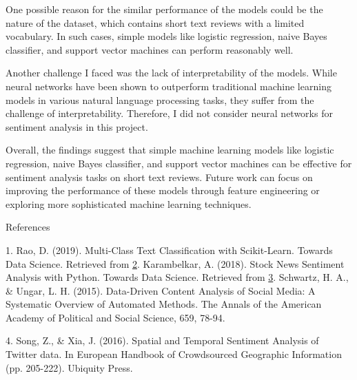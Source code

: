 \documentclass{article}
\begin{document}
One possible reason for the similar performance of the models could be the nature of the dataset, which contains short text reviews with a limited vocabulary. In such cases, simple models like logistic regression, naive Bayes classifier, and support vector machines can perform reasonably well.

Another challenge I faced was the lack of interpretability of the models. While neural networks have been shown to outperform traditional machine learning models in various natural language processing tasks, they suffer from the challenge of interpretability. Therefore, I did not consider neural networks for sentiment analysis in this project.

Overall, the findings suggest that simple machine learning models like logistic regression, naive Bayes classifier, and support vector machines can be effective for sentiment analysis tasks on short text reviews. Future work can focus on improving the performance of these models through feature engineering or exploring more sophisticated machine learning techniques.

\newpage
\pagebreak[]

References

1. Rao, D. (2019). Multi-Class Text Classification with Scikit-Learn. Towards Data Science. Retrieved from \href{https://towardsdatascience.com/multi-class-text-classification-with-scikit-learn-12f1e60e0a9f.}

2. Karambelkar, A. (2018). Stock News Sentiment Analysis with Python. Towards Data Science. Retrieved from \href{https://towardsdatascience.com/stock-news-sentiment-analysis-with-python-193d4b4378d4 }

3. Schwartz, H. A., & Ungar, L. H. (2015). Data-Driven Content Analysis of Social Media: A Systematic Overview of Automated Methods. The Annals of the American Academy of Political and Social Science, 659, 78-94. 

4. Song, Z., & Xia, J. (2016). Spatial and Temporal Sentiment Analysis of Twitter data. In European Handbook of Crowdsourced Geographic Information (pp. 205-222). Ubiquity Press. 
\end{document}
